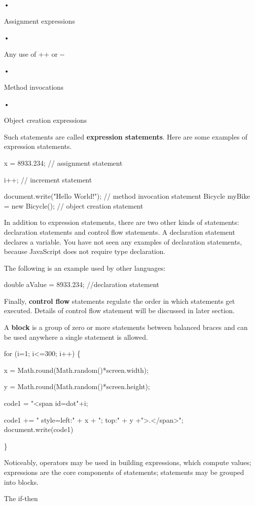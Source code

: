 \documentclass[
]{article}
\begin{document}
•

Assignment expressions

•

Any use of ++ or -\/-

•

Method invocations

•

Object creation expressions

Such statements are called \textbf{expression statements}. Here are some
examples of expression statements.

x = 8933.234; // assignment statement

i++; // increment statement

document.write("Hello World!"); // method invocation statement Bicycle
myBike = new Bicycle(); // object creation statement

In addition to expression statements, there are two other kinds of
statements: declaration statements and control flow statements. A
declaration statement declares a variable. You have not seen any
examples of declaration statements, because JavaScript does not require
type declaration.

The following is an example used by other languages:

double aValue = 8933.234; //declaration statement

Finally, \textbf{control flow} statements regulate the order in which
statements get executed. Details of control flow statement will be
discussed in later section.

A \textbf{block} is a group of zero or more statements between balanced
braces and can be used anywhere a single statement is allowed.

for (i=1; i\textless=300; i++) \{

x = Math.round(Math.random()*screen.width);

y = Math.round(Math.random()*screen.height);

code1 = "\textless span id=dot"+i;

code1 += " style=\textquotesingle left:" + x + "; top:" + y
+"\textquotesingle\textgreater.\textless/span\textgreater";
document.write(code1)

\}

Noticeably, operators may be used in building expressions, which compute
values; expressions are the core components of statements; statements
may be grouped into blocks.

The if-then
\end{document}
